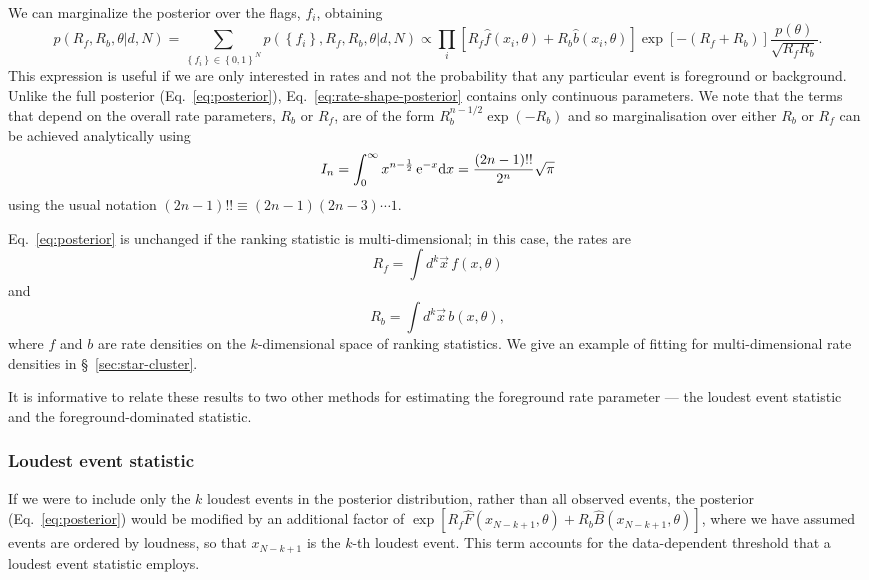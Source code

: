 \documentclass[aps,prd]{revtex4-1}
\newcommand{\mathset}[1]{\left\{ #1 \right\}}
\begin{document}
We can marginalize the posterior over the flags, $f_i$, obtaining
\begin{equation}
  \label{eq:rate-shape-posterior}
  p\left( R_f, R_b, \theta | d, N \right) = \sum_{\mathset{f_i} \in
    \mathset{0,1}^N} p\left( \mathset{f_i}, R_f, R_b, \theta | d, N
  \right) \propto \prod_{i} \left[ R_f \hat{f}\left(x_i, \theta\right)
    + R_b \hat{b}\left( x_i, \theta\right) \right] \exp\left[-\left(
    R_f + R_b \right) \right] \frac{p(\theta)}{\sqrt{R_f R_b}}.
\end{equation}
This expression is useful if we are only interested in rates and not
the probability that any particular event is foreground or background.
Unlike the full posterior (Eq.~\eqref{eq:posterior}),
Eq.~\eqref{eq:rate-shape-posterior} contains only continuous
parameters. We note that the terms that depend on the overall rate
parameters, $R_b$ or $R_f$, are of the form $R_b^{n-1/2} \exp(-R_b)$
and so marginalisation over either $R_b$ or $R_f$ can be achieved
analytically using
\begin{equation}
I_n = \int_0^{\infty} x^{n-\frac{1}{2}} \, {\rm e}^{-x} {\rm d} x =
\frac{(2n-1)!!}{2^n} \sqrt{\pi}
\end{equation}
using the usual notation $(2n-1)!! \equiv (2n-1)(2n-3)\cdots1$.

Eq.~\eqref{eq:posterior} is unchanged if the ranking statistic is
multi-dimensional; in this case, the rates are
\begin{equation}
  R_f = \int d^k \vec{x} \, f(x, \theta)
\end{equation}
and
\begin{equation}
  R_b = \int d^k \vec{x} \, b(x, \theta),
\end{equation}
where $f$ and $b$ are rate densities on the $k$-dimensional space of
ranking statistics.  We give an example of fitting for
multi-dimensional rate densities in \S~\ref{sec:star-cluster}.

It is informative to relate these results to two other methods for
estimating the foreground rate parameter --- the loudest event
statistic and the foreground-dominated statistic.

\subsubsection{Loudest event statistic}
If we were to include only the $k$ loudest events in the posterior
distribution, rather than all observed events, the posterior
(Eq.~\eqref{eq:posterior}) would be modified by an additional factor
of $\exp[R_f \hat{F}(x_{N-k+1},\theta) + R_b
  \hat{B}(x_{N-k+1},\theta)]$, where we have assumed events are
ordered by loudness, so that $x_{N-k+1}$ is the $k$-th loudest
event. This term accounts for the data-dependent threshold that a
loudest event statistic employs.
\end{document}
